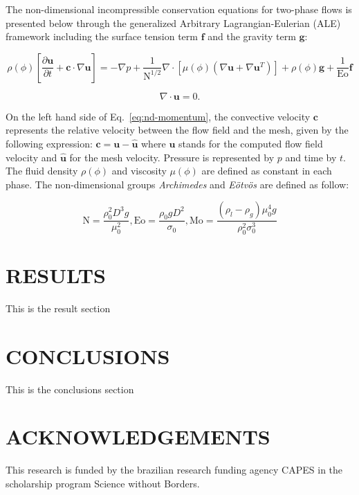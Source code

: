 \documentclass{wccm2014}
\newcommand{\uvet}{\mathbf{u}}
\newcommand{\cvet}{\mathbf{c}}
\newcommand{\Eo}{\mathrm{Eo}}
\newcommand{\N}{\mathrm{N}}
\newcommand{\Mo}{\mathrm{Mo}}
\begin{document}
The non-dimensional incompressible conservation equations for two-phase
flows is presented below through the generalized Arbitrary
Lagrangian-Eulerian (ALE) framework including the surface tension term
$\mathbf{f}$ and the gravity term $\mathbf{g}$: 

\begin{equation}
	\rho(\phi) [ \frac{\partial \uvet}{\partial t} 
	+ \cvet \cdot \nabla \uvet ]
	=
	- \nabla p 
	+ \frac{1}{\N^{1/2}} \nabla \cdot
	[\mu(\phi) ( \nabla \uvet + \nabla \uvet^T)]+
	\rho(\phi) \mathbf{g}+
	\frac{1}{\Eo} \mathbf{f}
	\label{eq:nd-momentum}
\end{equation}

\begin{equation}
	\nabla \cdot \uvet
	= 
	0.
\label{eq:nd-continuity} 
\end{equation}

On the left hand side of Eq.~\ref{eq:nd-momentum}, the convective velocity
$\cvet$ represents the relative velocity between the flow field and the
mesh, given by the following expression: $\cvet = \uvet - \hat{\uvet}$
where $\uvet$ stands for the computed flow field velocity and
$\hat{\uvet}$ for the mesh velocity. Pressure is represented by $p$ and
time by $t$. The fluid density $\rho(\phi)$ and viscosity $\mu(\phi)$
are defined as constant in each phase. The non-dimensional groups
\textit{Archimedes} and \textit{E\"otv\"os} are defined as follow:

\begin{equation}
 \N = \frac{\rho_0^2 D^3 g}{\mu_0^2},
 \Eo = \frac{\rho_0 g D^2}{\sigma_0},
 \Mo = \frac{(\rho_l-\rho_g)\mu_0^4 g}{\rho_{0}^2 \sigma_0^3} 
 \label{eq:nd-groups}
\end{equation}


\section{RESULTS}
\label{sec:results}
This is the result section
\section{CONCLUSIONS}
\label{sec:conclusions}
This is the conclusions section
\section{ACKNOWLEDGEMENTS}
\label{sec:acknowledgements}
This research is funded by the brazilian research funding agency CAPES
in the scholarship program Science without Borders.
\end{document}
